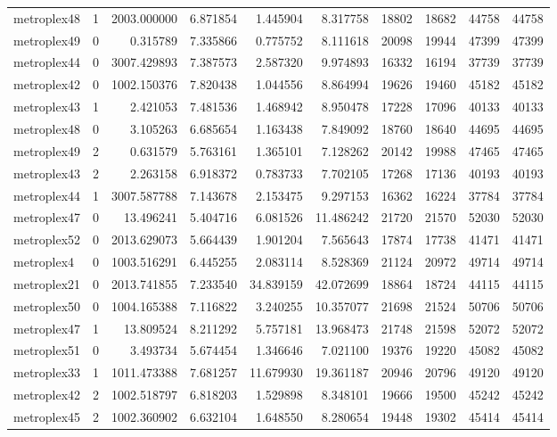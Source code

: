 \begin{longtable}{|l|r|r|r|r|r|r|r|r|r|}
metroplex48 & 1 & 2003.000000 & 6.871854 & 1.445904 & 8.317758 & 18802 & 18682 & 44758 & 44758 \\
metroplex49 & 0 & 0.315789 & 7.335866 & 0.775752 & 8.111618 & 20098 & 19944 & 47399 & 47399 \\
metroplex44 & 0 & 3007.429893 & 7.387573 & 2.587320 & 9.974893 & 16332 & 16194 & 37739 & 37739 \\
metroplex42 & 0 & 1002.150376 & 7.820438 & 1.044556 & 8.864994 & 19626 & 19460 & 45182 & 45182 \\
metroplex43 & 1 & 2.421053 & 7.481536 & 1.468942 & 8.950478 & 17228 & 17096 & 40133 & 40133 \\
metroplex48 & 0 & 3.105263 & 6.685654 & 1.163438 & 7.849092 & 18760 & 18640 & 44695 & 44695 \\
metroplex49 & 2 & 0.631579 & 5.763161 & 1.365101 & 7.128262 & 20142 & 19988 & 47465 & 47465 \\
metroplex43 & 2 & 2.263158 & 6.918372 & 0.783733 & 7.702105 & 17268 & 17136 & 40193 & 40193 \\
metroplex44 & 1 & 3007.587788 & 7.143678 & 2.153475 & 9.297153 & 16362 & 16224 & 37784 & 37784 \\
metroplex47 & 0 & 13.496241 & 5.404716 & 6.081526 & 11.486242 & 21720 & 21570 & 52030 & 52030 \\
metroplex52 & 0 & 2013.629073 & 5.664439 & 1.901204 & 7.565643 & 17874 & 17738 & 41471 & 41471 \\
metroplex4 & 0 & 1003.516291 & 6.445255 & 2.083114 & 8.528369 & 21124 & 20972 & 49714 & 49714 \\
metroplex21 & 0 & 2013.741855 & 7.233540 & 34.839159 & 42.072699 & 18864 & 18724 & 44115 & 44115 \\
metroplex50 & 0 & 1004.165388 & 7.116822 & 3.240255 & 10.357077 & 21698 & 21524 & 50706 & 50706 \\
metroplex47 & 1 & 13.809524 & 8.211292 & 5.757181 & 13.968473 & 21748 & 21598 & 52072 & 52072 \\
metroplex51 & 0 & 3.493734 & 5.674454 & 1.346646 & 7.021100 & 19376 & 19220 & 45082 & 45082 \\
metroplex33 & 1 & 1011.473388 & 7.681257 & 11.679930 & 19.361187 & 20946 & 20796 & 49120 & 49120 \\
metroplex42 & 2 & 1002.518797 & 6.818203 & 1.529898 & 8.348101 & 19666 & 19500 & 45242 & 45242 \\
metroplex45 & 2 & 1002.360902 & 6.632104 & 1.648550 & 8.280654 & 19448 & 19302 & 45414 & 45414 \\

\end{longtable}
